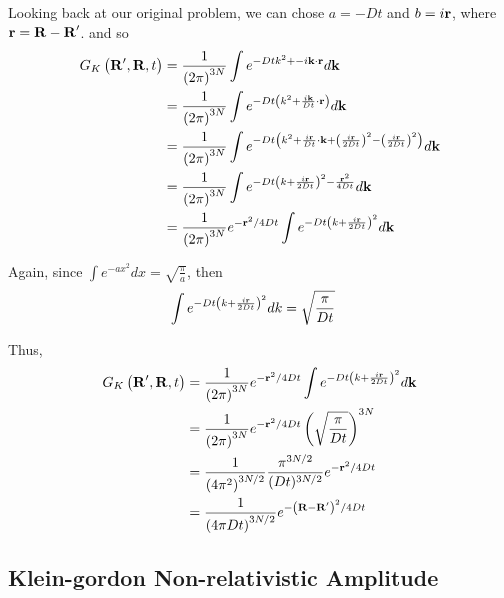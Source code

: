 Looking back at our original problem, we can chose $a = -Dt$ and $b = i \boldsymbol{\mathbf{r}}$, where $\boldsymbol{\mathbf{r}} = \boldsymbol{\mathbf{R}}-\boldsymbol{\mathbf{R}}^\prime$.
and so
\begin{align*}
G_K \left(\boldsymbol{\mathbf{R}}^\prime, \boldsymbol{\mathbf{R}}, t\right) &=
\frac{1}{\left(2\pi\right)^{3N}} \int e^{-Dtk^2 + -i\boldsymbol{\mathbf{k}}\cdot\boldsymbol{\mathbf{r}}} d\mathbf{k} \\
&= \frac{1}{\left(2\pi\right)^{3N}} \int e^{-Dt \left( k^2 + \frac{i\boldsymbol{\mathbf{k}}}{Dt}\cdot\boldsymbol{\mathbf{r}} \right)} d\mathbf{k} \\
&= \frac{1}{\left(2\pi\right)^{3N}} \int e^{-Dt \left( k^2 + \frac{i\boldsymbol{\mathbf{r}}}{Dt}\cdot\boldsymbol{\mathbf{k}} + \left(\frac{i\boldsymbol{\mathbf{r}}}{2Dt}\right)^2 - \left(\frac{i\boldsymbol{\mathbf{r}}}{2Dt}\right)^2 \right)} d\mathbf{k} \\
&= \frac{1}{\left(2\pi\right)^{3N}} \int e^{-Dt \left( k + \frac{i\boldsymbol{\mathbf{r}}}{2Dt}\right)^2 - \frac{ \boldsymbol{\mathbf{r}}^2 }{ 4Dt } } d\mathbf{k} \\
&= \frac{1}{\left(2\pi\right)^{3N}} e^{-\boldsymbol{\mathbf{r}}^2 /4Dt } \int e^{-Dt \left( k + \frac{i\boldsymbol{\mathbf{r}}}{2Dt}\right)^2 } d\mathbf{k} \\
\end{align*}

Again, since $\int e^{-ax^2} dx = \sqrt{ \frac{\pi}{a} }$,
then
\begin{align*}
\int e^{-Dt \left( k + \frac{i\boldsymbol{\mathbf{r}}}{2Dt}\right)^2 } dk &= \sqrt{ \frac{\pi}{Dt} }
\end{align*}

Thus,
\begin{align*}
G_K \left(\boldsymbol{\mathbf{R}}^\prime, \boldsymbol{\mathbf{R}}, t\right) &=
\frac{1}{\left(2\pi\right)^{3N}} e^{-\boldsymbol{\mathbf{r}}^2 /4Dt } \int e^{-Dt \left( k + \frac{i\boldsymbol{\mathbf{r}}}{2Dt}\right)^2 } d\mathbf{k} \\
&= \frac{1}{\left(2\pi\right)^{3N}} e^{-\boldsymbol{\mathbf{r}}^2 /4Dt } \left( \sqrt{ \frac{\pi}{Dt} } \right)^{3N} \\
&= \frac{1}{\left(4\pi^2\right)^{3N/2}} \frac{\pi^{3N/2}}{(Dt)^{3N/2}} e^{-\boldsymbol{\mathbf{r}}^2 /4Dt } \\
&= \frac{1}{\left(4\pi Dt\right)^{3N/2}} e^{-\left(\boldsymbol{\mathbf{R}} - \boldsymbol{\mathbf{R}}^\prime\right)^2 /4Dt }
\end{align*}




\subsection{Klein-gordon Non-relativistic Amplitude} \label{ps-kg:nonrelativistic-propagator}

